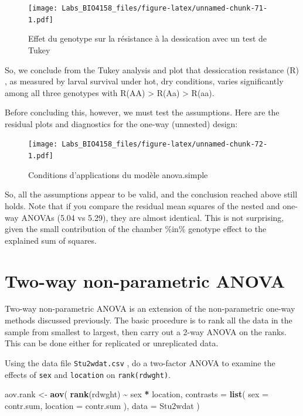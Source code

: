 \documentclass[
  12pt,
]{book}
\newenvironment{Shaded}{\begin{snugshade}}{\end{snugshade}}
\newcommand{\DataTypeTok}[1]{\textcolor[rgb]{0.13,0.29,0.53}{#1}}
\newcommand{\KeywordTok}[1]{\textcolor[rgb]{0.13,0.29,0.53}{\textbf{#1}}}
\newcommand{\NormalTok}[1]{#1}
\newcommand{\OperatorTok}[1]{\textcolor[rgb]{0.81,0.36,0.00}{\textbf{#1}}}
\newcommand{\StringTok}[1]{\textcolor[rgb]{0.31,0.60,0.02}{#1}}
\begin{document}
\begin{figure}
\centering
\texttt{[image: Labs\_BIO4158\_files/figure-latex/unnamed-chunk-71-1.pdf]}
\caption{\label{fig:unnamed-chunk-71}Effet du genotype sur la résistance à la dessication avec un test de Tukey}
\end{figure}

So, we conclude from the Tukey analysis and plot that dessiccation resistance (R) , as measured by larval survival under hot, dry conditions, varies significantly among all three genotypes with R(AA) \textgreater{} R(Aa) \textgreater{} R(aa).

Before concluding this, however, we must test the assumptions. Here are the residual plots and diagnostics for the one-way (unnested) design:

\begin{figure}
\centering
\texttt{[image: Labs\_BIO4158\_files/figure-latex/unnamed-chunk-72-1.pdf]}
\caption{\label{fig:unnamed-chunk-72}Conditions d'applications du modèle anova.simple}
\end{figure}

So, all the assumptions appear to be valid, and the conclusion reached above still holds. Note that if you compare the residual mean squares of the nested and one-way ANOVAs (5.04 vs 5.29), they are almost identical. This is not surprising, given the small contribution of the chamber \%in\% genotype effect to the explained sum of squares.

\hypertarget{two-way-non-parametric-anova}{%
\section{Two-way non-parametric ANOVA}\label{two-way-non-parametric-anova}}

Two-way non-parametric ANOVA is an extension of the non-parametric one-way methods discussed previously. The basic procedure is to rank all the data in the sample from smallest to largest, then carry out a 2-way ANOVA on the ranks. This can be done either for replicated or unreplicated data.

Using the data file \texttt{Stu2wdat.csv} , do a two-factor ANOVA to examine the effects of \texttt{sex} and \texttt{location} on \texttt{rank(rdwght)}.

\begin{Shaded}
\begin{Highlighting}[]
\NormalTok{aov.rank \textless{}{-}}\StringTok{ }\KeywordTok{aov}\NormalTok{(}
  \KeywordTok{rank}\NormalTok{(rdwght) }\OperatorTok{\textasciitilde{}}\StringTok{ }\NormalTok{sex }\OperatorTok{*}\StringTok{ }\NormalTok{location,}
  \DataTypeTok{contrasts =} \KeywordTok{list}\NormalTok{(}
    \DataTypeTok{sex =}\NormalTok{ contr.sum, }\DataTypeTok{location =}\NormalTok{ contr.sum}
\NormalTok{  ),}
  \DataTypeTok{data =}\NormalTok{ Stu2wdat}
\NormalTok{)}
\end{Highlighting}
\end{Shaded}
\end{document}
